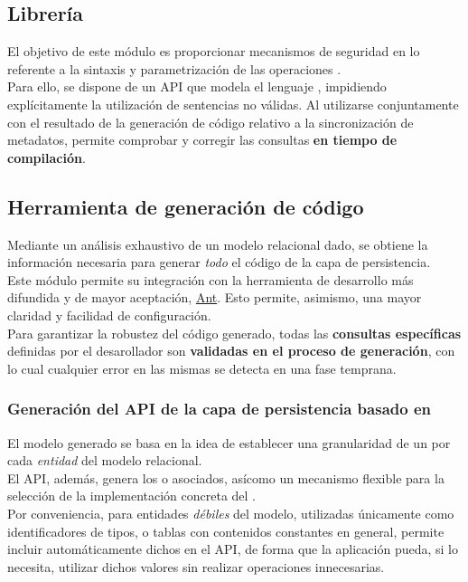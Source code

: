 \documentclass[dvips]{article}
\begin{document}
\subsection{Librer\'i{}a }
El objetivo de este m\'odulo es
proporcionar mecanismos de seguridad
en lo referente a la sintaxis y parametrizaci\'on de las operaciones
.\\
Para ello, se dispone de un API que modela el lenguaje ,
impidiendo expl\'i{}citamente la utilizaci\'on de sentencias no
v\'alidas. Al utilizarse conjuntamente con el resultado de la
generaci\'on de c\'odigo relativo a la sincronizaci\'on de metadatos,
permite comprobar y corregir las consultas \textbf{en tiempo de
  compilaci\'on}.
\subsection{Herramienta de generaci\'on de c\'odigo}
Mediante un an\'alisis exhaustivo de un modelo relacional dado, se
obtiene la informaci\'on necesaria para generar \textit{todo} el
c\'odigo de la capa de persistencia.\\
Este m\'odulo permite su integraci\'on con la herramienta de
desarrollo  m\'as difundida y de mayor aceptaci\'on,
\href{http://ant.apache.org}{Ant}. Esto permite, asimismo, una mayor
claridad y facilidad de configuraci\'on.\\
Para garantizar la robustez del c\'odigo generado, todas las \textbf{consultas
espec\'i{}ficas} definidas por el desarollador son \textbf{validadas
  en el proceso de generaci\'on}, con lo cual cualquier error en las mismas se
detecta en una fase temprana.
\subsubsection{Generaci\'on del API de la capa de persistencia basado en }
El modelo generado se basa en la idea de establecer una granularidad
de un  por cada \textit{entidad} del modelo
relacional.\\
El API, adem\'as, genera los  o  asociados, as\'i{}como un mecanismo flexible para
la selecci\'on de la implementaci\'on concreta del .\\
Por conveniencia, para entidades \textit{d\'ebiles} del modelo,
utilizadas \'unicamente como identificadores de tipos, o tablas con
contenidos constantes en general, \queryj permite incluir
autom\'aticamente dichos en el API, de forma que la aplicaci\'on
pueda, si lo necesita, utilizar dichos valores sin realizar
operaciones  innecesarias.
\end{document}
